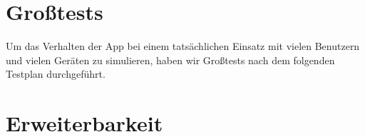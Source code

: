 


\clearpage
\section{Großtests}

Um das Verhalten der App bei einem tatsächlichen Einsatz mit vielen Benutzern und vielen Geräten zu simulieren, haben wir Großtests nach dem folgenden Testplan durchgeführt.


\clearpage


\clearpage




\clearpage
\section{Erweiterbarkeit}


